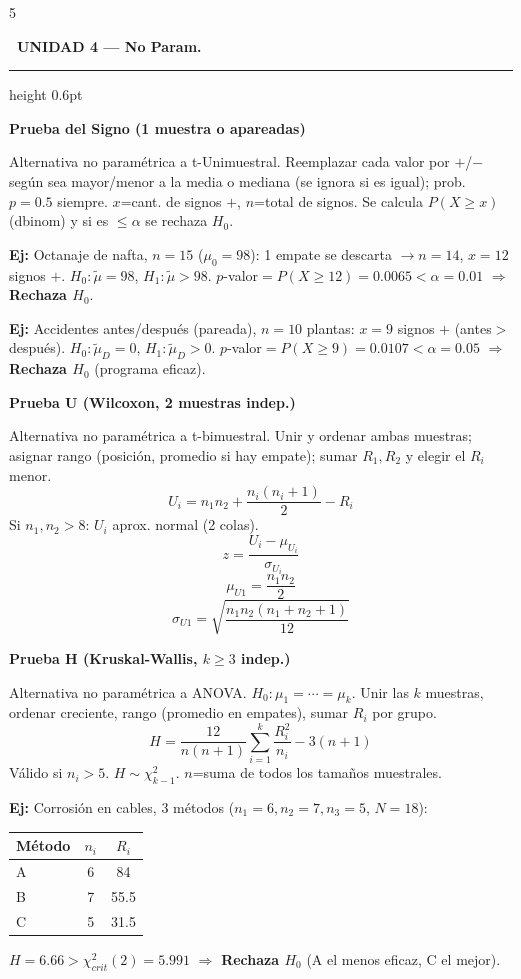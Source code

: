 \documentclass[9pt,a4paper]{article}
\newcommand{\bodysize}{\fontsize{7.5}{8.7}\selectfont}
\newcommand{\notesize}{\fontsize{6.4}{7.4}\selectfont}
\newcommand{\subsize}{\fontsize{8.6}{10}\selectfont\bfseries}
\newcommand{\unitsize}{\fontsize{9.8}{11.3}\selectfont\bfseries}
\newcommand{\unithead}[2]{%
  \par\vspace{2pt}
  \noindent\colorbox{#1!22}{\textcolor{#1!65!black}{\unitsize\ #2}}%
  \par\vspace{1pt}\hrule height 0.6pt \color{#1!55!black}\vspace{1.5pt}\color{black}%
}
\newcommand{\topic}[2]{\subsize\textcolor{#1!60!black}{#2}\par\vspace{0.5pt}\bodysize}
\newcommand{\ejemplo}[1]{{\notesize\textbf{Ej:} #1\par}\bodysize}
\begin{document}
\bodysize

\begin{multicols}{5}

\unithead{violet}{UNIDAD 4 --- No Param.}

\topic{violet}{Prueba del Signo (1 muestra o apareadas)}
Alternativa no paramétrica a t-Unimuestral. Reemplazar cada valor por $+$/$-$ según sea mayor/menor a la media o mediana (se ignora si es igual); prob. $p=0.5$ siempre. $x$=cant. de signos $+$, $n$=total de signos. Se calcula $P(X\geq x)$ (dbinom) y si es $\leq\alpha$ se rechaza $H_0$.

\ejemplo{Octanaje de nafta, $n=15$ ($\mu_0=98$): 1 empate se descarta $\to n=14$, $x=12$ signos $+$. $H_0:\tilde\mu=98$, $H_1:\tilde\mu>98$. $p$-valor$=P(X\geq12)=0.0065<\alpha=0.01$ $\Rightarrow$ \textbf{Rechaza $H_0$}.}

\ejemplo{Accidentes antes/después (pareada), $n=10$ plantas: $x=9$ signos $+$ (antes$>$después). $H_0:\tilde\mu_D=0$, $H_1:\tilde\mu_D>0$. $p$-valor$=P(X\geq9)=0.0107<\alpha=0.05$ $\Rightarrow$ \textbf{Rechaza $H_0$} (programa eficaz).}

\topic{violet}{Prueba U (Wilcoxon, 2 muestras indep.)}
Alternativa no paramétrica a t-bimuestral. Unir y ordenar ambas muestras; asignar rango (posición, promedio si hay empate); sumar $R_1,R_2$ y elegir el $R_i$ menor.
\[
U_i=n_1n_2+\frac{n_i(n_i+1)}{2}-R_i
\]
Si $n_1,n_2>8$: $U_i$ aprox. normal (2 colas).
\[
z=\frac{U_i-\mu_{U_i}}{\sigma_{U_i}}
\]
\[
\mu_{U1}=\frac{n_1n_2}{2}
\]
\[
\sigma_{U1}=\sqrt{\frac{n_1n_2(n_1+n_2+1)}{12}}
\]

\topic{violet}{Prueba H (Kruskal-Wallis, $k\geq3$ indep.)}
Alternativa no paramétrica a ANOVA. $H_0:\mu_1=\cdots=\mu_k$. Unir las $k$ muestras, ordenar creciente, rango (promedio en empates), sumar $R_i$ por grupo.
\[
H=\frac{12}{n(n+1)}\sum_{i=1}^{k}\frac{R_i^2}{n_i}-3(n+1)
\]
Válido si $n_i>5$. $H\sim\chi^2_{k-1}$. $n$=suma de todos los tamaños muestrales.

\ejemplo{Corrosión en cables, 3 métodos ($n_1{=}6,n_2{=}7,n_3{=}5$, $N=18$):
\begin{center}
{\notesize
\setlength{\tabcolsep}{3pt}
\begin{tabular}{@{}l c c@{}}
\toprule
Método & $n_i$ & $R_i$ \\
\midrule
A & 6 & 84 \\
B & 7 & 55.5 \\
C & 5 & 31.5 \\
\bottomrule
\end{tabular}
}
\end{center}
$H=6.66>\chi^2_{crit}(2)=5.991$ $\Rightarrow$ \textbf{Rechaza $H_0$} (A el menos eficaz, C el mejor).}


\end{multicols}
\end{document}
